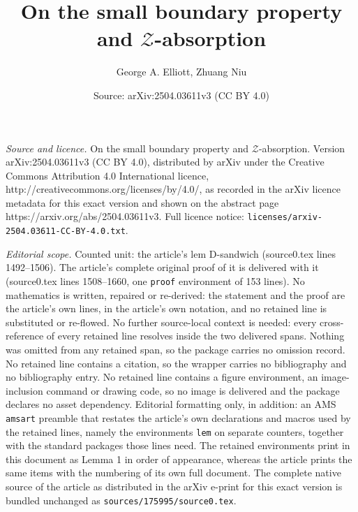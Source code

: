 \documentclass[10pt,a4paper]{amsart}
\title{On the small boundary property and $\mathcal Z$-absorption}
\author{George A. Elliott, Zhuang Niu}
\date{Source: arXiv:2504.03611v3 (CC BY 4.0)}
\begin{document}
\maketitle

\noindent\emph{Source and licence.} On the small boundary property and $\mathcal Z$-absorption. Version arXiv:2504.03611v3 (CC BY 4.0), distributed by arXiv under the Creative Commons Attribution 4.0 International licence, http://creativecommons.org/licenses/by/4.0/, as recorded in the arXiv licence metadata for this exact version and shown on the abstract page https://arxiv.org/abs/2504.03611v3. Full licence notice: \texttt{licenses/arxiv-2504.03611-CC-BY-4.0.txt}.\par\smallskip

\noindent\textit{Editorial scope.} Counted unit: the article's lem D-sandwich (source0.tex lines 1492--1506). The article's complete original proof of it is delivered with it (source0.tex lines 1508--1660, one \texttt{proof} environment of 153 lines). No mathematics is written, repaired or re-derived: the statement and the proof are the article's own lines, in the article's own notation, and no retained line is substituted or re-flowed.  No further source-local context is needed: every cross-reference of every retained line resolves inside the two delivered spans.  Nothing was omitted from any retained span, so the package carries no omission record.  No retained line contains a citation, so the wrapper carries no bibliography and no bibliography entry.  No retained line contains a figure environment, an image-inclusion command or drawing code, so no image is delivered and the package declares no asset dependency.  Editorial formatting only, in addition: an AMS \texttt{amsart} preamble that restates the article's own declarations and macros used by the retained lines, namely the environments \texttt{lem} on separate counters, together with the standard packages those lines need.  The retained environments print in this document as Lemma 1 in order of appearance, whereas the article prints the same items with the numbering of its own full document.  The complete native source of the article as distributed in the arXiv e-print for this exact version is bundled unchanged as \texttt{sources/175995/source0.tex}.
\end{document}
